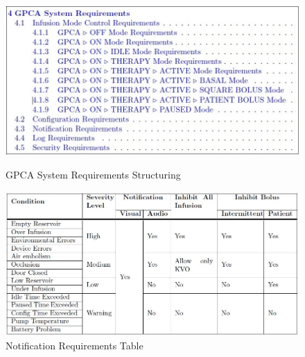  \begin{figure}[h!]
    \centering
    \includegraphics[width=\columnwidth]{images/structuring.jpg}
    \caption{GPCA System Requirements Structuring}
    \label{fig:gpca-requirements}
    \vspace{0.1cm}
    \includegraphics[width=\columnwidth]{images/alarm.jpg}
    \caption{Notification Requirements Table}
    \label{fig:gpca-alarm}
    \vspace{-0.2in}
 \end{figure}

